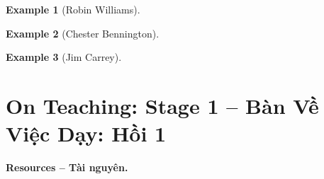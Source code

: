 \documentclass[12pt,twoside]{book}
\newtheorem{example}{Example}
\begin{document}
\begin{example}[{\sc Robin Williams}]
	
\end{example}

\begin{example}[{\sc Chester Bennington}]
	
\end{example}

\begin{example}[{\sc Jim Carrey}]
	
\end{example}


\chapter{On Teaching: Stage 1 -- Bàn Về Việc Dạy: Hồi 1}
\label{sect: teaching}
\minitoc
\noindent\textbf{\textsf{Resources -- Tài nguyên.}}
\end{document}
